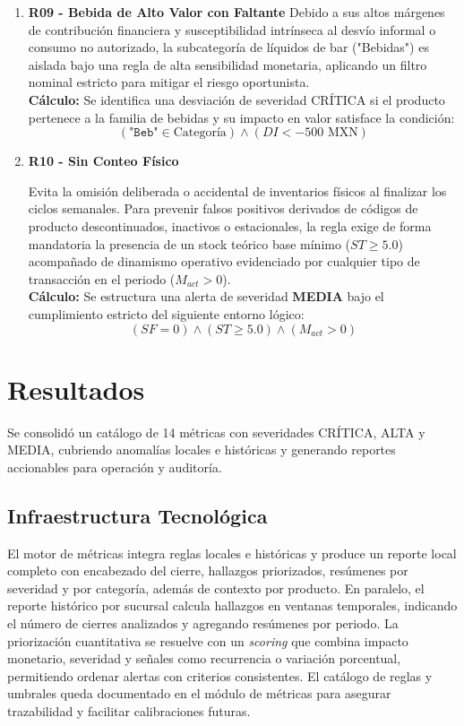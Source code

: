 \documentclass[11pt]{article}
\begin{document}
\begin{enumerate}
    \item \textbf{R09 - Bebida de Alto Valor con Faltante}
         Debido a sus altos márgenes de contribución financiera y susceptibilidad intrínseca al desvío informal o consumo no autorizado, la subcategoría de líquidos de bar ("Bebidas") es aislada bajo una regla de alta sensibilidad monetaria, aplicando un filtro nominal estricto para mitigar el riesgo oportunista.
         \\
        \textbf{Cálculo:}
        Se identifica una desviación de severidad CRÍTICA si el producto pertenece a la familia de bebidas y su impacto en valor satisface la condición:
        \[ (\texttt{"Beb"} \in \text{Categoría}) \land (DI < -500 \text{ MXN}) \]
    

    \item \textbf{R10 - Sin Conteo Físico}
    

         Evita la omisión deliberada o accidental de inventarios físicos al finalizar los ciclos semanales. Para prevenir falsos positivos derivados de códigos de producto descontinuados, inactivos o estacionales, la regla exige de forma mandatoria la presencia de un stock teórico base mínimo ($ST \ge 5.0$) acompañado de dinamismo operativo evidenciado por cualquier tipo de transacción en el periodo ($M_{act} > 0$).
         \\
        \textbf{Cálculo:}
        Se estructura una alerta de severidad \textbf{MEDIA} bajo el cumplimiento estricto del siguiente entorno lógico:
        \[ (SF = 0) \land (ST \ge 5.0) \land (M_{act} > 0) \]

\end{enumerate}

\section*{Resultados}
Se consolidó un catálogo de 14 métricas con severidades CRÍTICA, ALTA y MEDIA, cubriendo anomalías locales e históricas y generando reportes accionables para operación y auditoría.

\subsection*{Infraestructura Tecnológica}
El motor de métricas integra reglas locales e históricas y produce un reporte local completo con encabezado del cierre, hallazgos priorizados, resúmenes por severidad y por categoría, además de contexto por producto. En paralelo, el reporte histórico por sucursal calcula hallazgos en ventanas temporales, indicando el número de cierres analizados y agregando resúmenes por periodo. La priorización cuantitativa se resuelve con un \textit{scoring} que combina impacto monetario, severidad y señales como recurrencia o variación porcentual, permitiendo ordenar alertas con criterios consistentes. El catálogo de reglas y umbrales queda documentado en el módulo de métricas para asegurar trazabilidad y facilitar calibraciones futuras.
\end{document}
